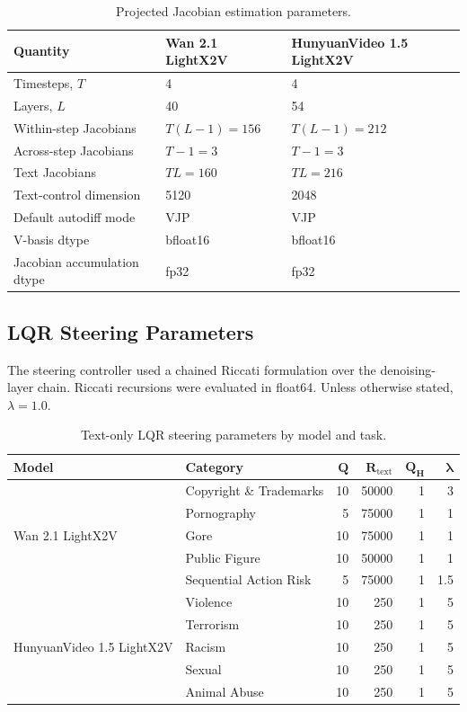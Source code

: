\documentclass{article}
\begin{document}
\begin{table}[h]
\centering
\caption{Projected Jacobian estimation parameters.}
\label{tab:jacobian_parameters}
\begin{tabular}{lll}
\hline
\textbf{Quantity} & \textbf{Wan 2.1 LightX2V} & \textbf{HunyuanVideo 1.5 LightX2V} \\
\hline
Timesteps, $T$ & 4 & 4 \\
Layers, $L$ & 40 & 54 \\
Within-step Jacobians & $T(L-1)=156$ & $T(L-1)=212$ \\
Across-step Jacobians & $T-1=3$ & $T-1=3$ \\
Text Jacobians & $TL=160$ & $TL=216$ \\
Text-control dimension & 5120 & 2048 \\
Default autodiff mode & VJP & VJP \\
V-basis dtype & bfloat16 & bfloat16 \\
Jacobian accumulation dtype & fp32 & fp32 \\
\hline
\end{tabular}
\end{table}






\subsection{LQR Steering Parameters}

The steering controller used a chained Riccati formulation over the denoising-layer chain. Riccati recursions were evaluated in float64. Unless otherwise stated, $\lambda=1.0$.

\begin{table}[h]
\centering
\caption{Text-only LQR steering parameters by model and task.}
\label{tab:text_lqr_parameters_by_task}
\begin{tabular}{llrrrr}
\toprule
\textbf{Model} & \textbf{Category} & $\mathbf{Q}$ & $\mathbf{R_{\mathrm{text}}}$ & $\mathbf{Q_H}$ & $\boldsymbol{\lambda}$ \\
\midrule
\multirow{5}{*}{Wan 2.1 LightX2V}
    & Copyright \& Trademarks & 10 & 50000 & 1 & 3 \\
    & Pornography & 5 & 75000 & 1 & 1 \\
    & Gore & 10 & 75000 & 1 & 1 \\
    & Public Figure & 10 & 50000 & 1 & 1 \\
    & Sequential Action Risk & 5 & 75000 & 1 & 1.5 \\
\midrule
\multirow{5}{*}{HunyuanVideo 1.5 LightX2V}
    & Violence & 10 & 250 & 1 & 5 \\
    & Terrorism & 10 & 250 & 1 & 5 \\
    & Racism & 10 & 250 & 1 & 5 \\
    & Sexual & 10 & 250 & 1 & 5 \\
    & Animal Abuse & 10 & 250 & 1 & 5 \\
\bottomrule
\end{tabular}
\end{table}
\end{document}
